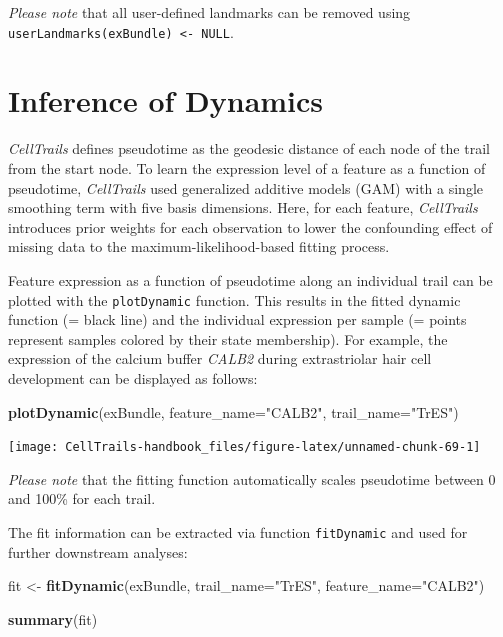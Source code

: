 \documentclass[]{book}
\newenvironment{Shaded}{\begin{snugshade}}{\end{snugshade}}
\newcommand{\KeywordTok}[1]{\textcolor[rgb]{0.13,0.29,0.53}{\textbf{#1}}}
\newcommand{\DataTypeTok}[1]{\textcolor[rgb]{0.13,0.29,0.53}{#1}}
\newcommand{\StringTok}[1]{\textcolor[rgb]{0.31,0.60,0.02}{#1}}
\newcommand{\NormalTok}[1]{#1}
\theoremstyle{definition}
\theoremstyle{definition}
\theoremstyle{definition}
\theoremstyle{remark}
\begin{document}
\emph{Please note} that all user-defined landmarks can be removed using
\texttt{userLandmarks(exBundle)\ \textless{}-\ NULL}.

\section{Inference of Dynamics}\label{inference-of-dynamics}

\emph{CellTrails} defines pseudotime as the geodesic distance of each
node of the trail from the start node. To learn the expression level of
a feature as a function of pseudotime, \emph{CellTrails} used
generalized additive models (GAM) with a single smoothing term with five
basis dimensions. Here, for each feature, \emph{CellTrails} introduces
prior weights for each observation to lower the confounding effect of
missing data to the maximum-likelihood-based fitting process.

Feature expression as a function of pseudotime along an individual trail
can be plotted with the \texttt{plotDynamic} function. This results in
the fitted dynamic function (= black line) and the individual expression
per sample (= points represent samples colored by their state
membership). For example, the expression of the calcium buffer
\emph{CALB2} during extrastriolar hair cell development can be displayed
as follows:

\begin{Shaded}
\begin{Highlighting}[]
\KeywordTok{plotDynamic}\NormalTok{(exBundle, }\DataTypeTok{feature_name=}\StringTok{"CALB2"}\NormalTok{, }\DataTypeTok{trail_name=}\StringTok{"TrES"}\NormalTok{)}
\end{Highlighting}
\end{Shaded}

\texttt{[image: CellTrails-handbook\_files/figure-latex/unnamed-chunk-69-1]}

\emph{Please note} that the fitting function automatically scales
pseudotime between 0 and 100\% for each trail.

The fit information can be extracted via function \texttt{fitDynamic}
and used for further downstream analyses:

\begin{Shaded}
\begin{Highlighting}[]
\NormalTok{fit <-}\StringTok{ }\KeywordTok{fitDynamic}\NormalTok{(exBundle, }\DataTypeTok{trail_name=}\StringTok{"TrES"}\NormalTok{, }\DataTypeTok{feature_name=}\StringTok{"CALB2"}\NormalTok{)}

\KeywordTok{summary}\NormalTok{(fit)}
\end{Highlighting}
\end{Shaded}
\end{document}
